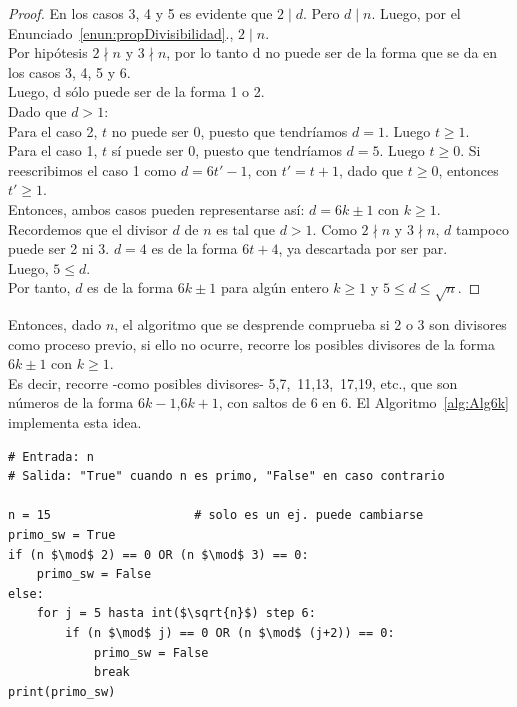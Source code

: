 \begin{proof}
En los casos 3, 4 y 5 es evidente que $2 \mid d$. Pero $d \mid n$. Luego, por el Enunciado~\ref{enun:propDivisibilidad}., $2 \mid n$. \\
Por hipótesis $2 \nmid n$ y $3 \nmid n$, por lo tanto d no puede ser de la forma que se da en los casos 3, 4, 5 y 6. \\
Luego, d sólo puede ser de la forma 1 o 2. \\
Dado que $d > 1$: \\
Para el caso 2, $t$ no puede ser $0$, puesto que tendríamos $d = 1$. Luego $t \geq 1$. \\
Para el caso 1, $t$ sí puede ser $0$, puesto que tendríamos $d = 5$. Luego $t \geq 0$. Si reescribimos el caso 1 como $d = 6t' - 1$, con $t' = t + 1$, dado que $t \geq 0$, entonces $t' \geq 1$. \\
Entonces, ambos casos pueden representarse así:
$d = 6k \pm 1$ con $k \geq 1$. \\
Recordemos que el divisor $d$ de $n$ es tal que $d > 1$. Como $2 \nmid n$ y $3 \nmid n$, $d$ tampoco puede ser 2 ni 3. $d = 4$ es de la forma $6t + 4$, ya descartada por ser par. \\
Luego, $5 \leq d$. \\
Por tanto, $d$ es de la forma $6k \pm 1$ para algún entero $k \geq 1$ y $5 \leq d \leq \sqrt{n}$.

\end{proof}

Entonces, dado $n$, el algoritmo que se desprende comprueba si 2 o 3 son divisores como proceso previo, si ello no ocurre, recorre los posibles divisores de la forma $6k \pm 1$ con $k \geq 1$. \\
Es decir, recorre -como posibles divisores- 5,7, \,11,13, \,17,19, etc., que son números de la forma $6k - 1$,$6k + 1$, con saltos de 6 en 6.  El Algoritmo~\ref{alg:Alg6k} implementa esta idea.

\begin{lstlisting}[caption={Testeo de primalidad optimizado mediante la regla del $6k \pm 1$}, label={alg:Alg6k}, mathescape=true]
# Entrada: n
# Salida: "True" cuando n es primo, "False" en caso contrario

n = 15                    # solo es un ej. puede cambiarse
primo_sw = True 
if (n $\mod$ 2) == 0 OR (n $\mod$ 3) == 0:
    primo_sw = False
else:
    for j = 5 hasta int($\sqrt{n}$) step 6:
        if (n $\mod$ j) == 0 OR (n $\mod$ (j+2)) == 0:
            primo_sw = False
            break              
print(primo_sw)
\end{lstlisting}


